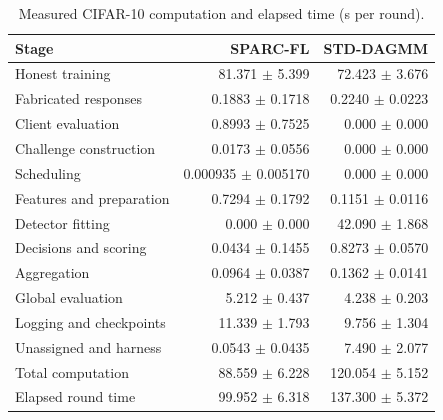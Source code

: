 \begin{table}[t]\centering\footnotesize\setlength{\tabcolsep}{8pt}
\caption{Measured CIFAR-10 computation and elapsed time (s per round).}\label{tab:std-segments-cifar10}
\begin{tabular}{lrr}\toprule Stage & SPARC-FL & STD-DAGMM \\ \midrule
Honest training & 81.371 $\pm$ 5.399 & 72.423 $\pm$ 3.676 \\
Fabricated responses & 0.1883 $\pm$ 0.1718 & 0.2240 $\pm$ 0.0223 \\
Client evaluation & 0.8993 $\pm$ 0.7525 & 0.000 $\pm$ 0.000 \\
Challenge construction & 0.0173 $\pm$ 0.0556 & 0.000 $\pm$ 0.000 \\
Scheduling & 0.000935 $\pm$ 0.005170 & 0.000 $\pm$ 0.000 \\
Features and preparation & 0.7294 $\pm$ 0.1792 & 0.1151 $\pm$ 0.0116 \\
Detector fitting & 0.000 $\pm$ 0.000 & 42.090 $\pm$ 1.868 \\
Decisions and scoring & 0.0434 $\pm$ 0.1455 & 0.8273 $\pm$ 0.0570 \\
Aggregation & 0.0964 $\pm$ 0.0387 & 0.1362 $\pm$ 0.0141 \\
Global evaluation & 5.212 $\pm$ 0.437 & 4.238 $\pm$ 0.203 \\
\midrule
Logging and checkpoints & 11.339 $\pm$ 1.793 & 9.756 $\pm$ 1.304 \\
Unassigned and harness & 0.0543 $\pm$ 0.0435 & 7.490 $\pm$ 2.077 \\
\midrule
Total computation & 88.559 $\pm$ 6.228 & 120.054 $\pm$ 5.152 \\
Elapsed round time & 99.952 $\pm$ 6.318 & 137.300 $\pm$ 5.372 \\
\bottomrule\end{tabular}\end{table}
